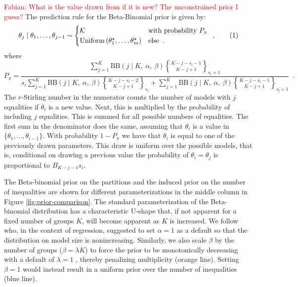 \documentclass[11pt,a4paper]{article}
\theoremstyle{definition} %
\theoremstyle{case}
\newcommand{\BetaBinom}[4]{\text{BB}\left(#1 \mid #2 ,\ #3 ,\ #4 \right)}
\DeclareRobustCommand{\stirling}{\genfrac\{\}{0pt}{}}
\newcommand{\rstirling}[3]{\stirling{#1}{#2}_{#3}}
\newcommand{\bellnum}[1]{B_{#1}}
\newcommand{\numberthis}{\addtocounter{equation}{1}\tag{\theequation}}
\newcommand{\FD}[1]{\textcolor{red}{Fabian: #1 }}
\begin{document}
\FD{What is the value drawn from if it is new? The unconstrained prior I guess?}
The prediction rule for the Beta-Binomial prior is given by:
\begin{equation}
    \theta_j \mid \theta_1, \ldots, \theta_{j - 1} \sim \begin{cases}
    \mathcal{K} & \text{with probability } P_{\pi} \\
    \text{Uniform}\left(\theta_1^{\star}, \ldots, \theta_m^{\star}\right) & \text{else} \enspace .
    \end{cases} \enspace , \numberthis
\end{equation}
where
\begin{equation}
    P_{\pi} = \frac{
        \sum_{j=1}^K \BetaBinom{j}{K}{\alpha}{\beta} \rstirling{K-j-s_i-1}{K-j+1}{s_i + 1}
    }{
        s_i \sum_{j=1}^K \BetaBinom{j}{K}{\alpha}{\beta} \rstirling{K-j-s_i-2}{K-j+1}{s_i    } +
          \sum_{j=1}^K \BetaBinom{j}{K}{\alpha}{\beta} \rstirling{K-j-s_i-1}{K-j+1}{s_i + 1}
    } \enspace .
\end{equation}
The $r$-Stirling number in the numerator counts the number of models with $j$ equalities if $\theta_i$ is a new value. Next, this is multiplied by the probability of including $j$ equalities. This is summed for all possible numbers of equalities. 
The first sum in the denominator does the same, assuming that $\theta_i$ is a value in $\{\theta_1, \dots, \theta_{i-1}\}$. With probability $1 - P_{\pi}$ we have that $\theta_i$ is equal to one of the previously drawn parameters. This draw is uniform over the possible models, that is, conditional on drawing a previous value the probability of $\theta_i = \theta_j$ is proportional to $\bellnum{K-j-1}{s_i}$.

The Beta-binomial prior on the partitions and the induced prior on the number of inequalities are shown for different parameterizations in the middle column in Figure \ref{fig:prior-comparison}. The standard parameterization of the Beta-binomial distribution has a characteristic U-shape that, if not apparent for a fixed number of groups $K$, will become apparent as $K$ is increased. We follow \textcite{wilson2010bayesian} who, in the context of regression, suggested to set $\alpha = 1$ as a default so that the distribution on model size is nonincreasing. Similarly, we also scale $\beta$ by the number of groups ($\beta = \lambda K$) to force the prior to be monotonically decreasing with a default of $\lambda = 1$ \parencite{wilson2010bayesian}, thereby penalizing multiplicity (orange line). Setting $\beta = 1$ would instead result in a uniform prior over the number of inequalities (blue line).
\end{document}
